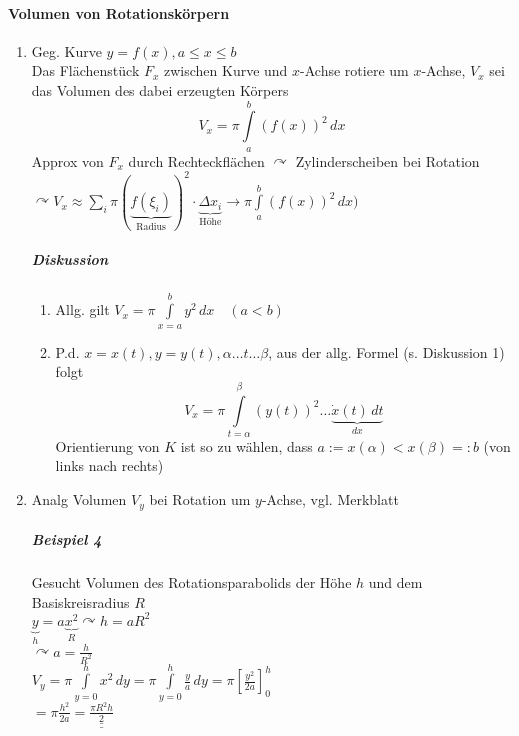 \documentclass[a4paper]{scrartcl}
\begin{document}
\paragraph{Volumen von Rotationskörpern}
\begin{enumerate}
\item Geg. Kurve $y= f(x), a \leq x \leq b$\\
Das Flächenstück $F_x$ zwischen Kurve und $x$-Achse rotiere um $x$-Achse, $V_x$ sei das Volumen des dabei erzeugten Körpers %
\[ V_x = \pi \int\limits_a^b (f(x))^2 \, dx\]
Approx von $F_x$ durch Rechteckflächen $\curvearrowright$ Zylinderscheiben bei Rotation $\curvearrowright V_x \approx \sum\limits_i  \pi (\underbrace{f(\xi_i)}_{\text{Radius}})^2 \cdot \underbrace{\Delta x_i}_{\text{Höhe}} \rightarrow \pi  \int\limits_{a}^{b} (f(x))^2 \, dx)$

\subparagraph{Diskussion}
\begin{enumerate}
\item Allg. gilt $V_x = \pi \int\limits_{x=a}^{b} y^2 \, dx \quad  (a < b)$
\item P.d. $x=x(t), y=y(t) , \alpha \dots t \dots \beta $, aus der allg. Formel (s. Diskussion 1) folgt
\[ V_x = \pi \int\limits_{t=\alpha}^{\beta} (y(t))^2 \dots \underbrace{\dot{x} (t) \, dt}_{dx} \]
Orientierung von $K$ ist so zu wählen, dass $a:= x(\alpha) < x (\beta) =: b$ (von links nach rechts)
\end{enumerate}
\item Analg Volumen $V_y$ bei Rotation um $y$-Achse, vgl. Merkblatt

\subparagraph{Beispiel 4} Gesucht Volumen des Rotationsparabolids der Höhe $h$ und dem Basiskreisradius $R$\\
$\underbrace{y}_{h}=a\underbrace{x^2}_{R} \curvearrowright h = a R^2 $\\
$\curvearrowright a = \frac{h}{R^2}$\\
$V_y = \pi \int\limits_{y=0}^{h} x^2 \, dy = \pi \int\limits_{y=0}^h \frac{y}{a} \, dy = \pi \left [ \frac{y^2}{2a} \right ]_0^h$\\
$= \pi \frac{h^2}{2a} = \underline{\underline{\frac{\pi R^2 h}{2}}}$
\end{enumerate}
\end{document}
